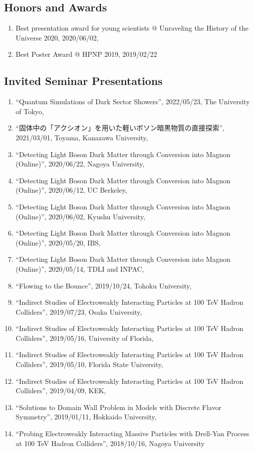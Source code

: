 \documentclass[12pt]{article}
\begin{document}
\subsection*{Honors and Awards}
\begin{enumerate}
 \item Best presentation award for young scientists @ Unraveling the History of the Universe 2020, 2020/06/02,\item Best Poster Award @ HPNP 2019, 2019/02/22
\end{enumerate}



\nocite{*}

\subsection*{Invited Seminar Presentations}
\begin{enumerate}
 \item ``Quantum Simulations of Dark Sector Showers'', 2022/05/23, The University of Tokyo,\item ``固体中の「アクシオン」を用いた軽いボソン暗黒物質の直接探索'', 2021/03/01, Toyama, Kanazawa University,\item ``Detecting Light Boson Dark Matter through Conversion into Magnon (Online)'', 2020/06/22, Nagoya University,\item ``Detecting Light Boson Dark Matter through Conversion into Magnon (Online)'', 2020/06/12, UC Berkeley,\item ``Detecting Light Boson Dark Matter through Conversion into Magnon (Online)'', 2020/06/02, Kyushu University,\item ``Detecting Light Boson Dark Matter through Conversion into Magnon (Online)'', 2020/05/20, IBS,\item ``Detecting Light Boson Dark Matter through Conversion into Magnon (Online)'', 2020/05/14, TDLI and INPAC,\item ``Flowing to the Bounce'', 2019/10/24, Tohoku University,\item ``Indirect Studies of Electroweakly Interacting Particles at 100 TeV Hadron Colliders'', 2019/07/23, Osaka University,\item ``Indirect Studies of Electroweakly Interacting Particles at 100 TeV Hadron Colliders'', 2019/05/16, University of Florida,\item ``Indirect Studies of Electroweakly Interacting Particles at 100 TeV Hadron Colliders'', 2019/05/10, Florida State University,\item ``Indirect Studies of Electroweakly Interacting Particles at 100 TeV Hadron Colliders'', 2019/04/09, KEK,\item ``Solutions to Domain Wall Problem in Models with Discrete Flavor Symmetry'', 2019/01/11, Hokkaido University,\item ``Probing Electroweakly Interacting Massive Particles with Drell-Yan Process at 100 TeV Hadron Colliders'', 2018/10/16, Nagoya University
\end{enumerate}
\end{document}
